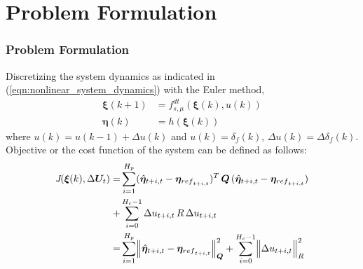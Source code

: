 \documentclass{beamer}
\DeclarePairedDelimiter{\norm}{\lVert}{\rVert}
\begin{document}

\section{Problem Formulation}
\begin{frame}
	\frametitle{Problem Formulation}
	Discretizing the system dynamics as indicated in (\ref{eqn:nonlinear_system_dynamics}) with the Euler method,
	\begin{subequations} 
		\label{eqn:discretize_system}
		\begin{align} 
		{\bm{\xi}}(k+1) &= f^{dt}_{s,\mu}(\bm{\xi}(k),u(k)) \\
		\bm{\eta}(k) &= h(\bm{\xi}(k))
		\end{align} 
	\end{subequations}
	where $u(k) = u(k-1)+\Delta u(k)$ and $u(k)=\delta_{f}(k)$, $\Delta u(k)=\Delta\delta_{f}(k)$. Objective or the cost function of the system can be defined as follows:
	\begin{align}
		{\textit{J}}(\boldsymbol{\xi}(k),\Delta\boldsymbol{U}_{t}) =& \sum\limits_{i=1}^{H_{p}}(\hat{\boldsymbol{\eta}}_{t+i,t}-{\boldsymbol{\eta}}_{{ref}_{t+i,t}})^{T}\,\boldsymbol{{Q}}\,(\hat{\boldsymbol{\eta}}_{t+i,t}-{\boldsymbol{\eta}}_{{ref}_{t+i,t}})  \nonumber\\
		+&\sum\limits_{i=0}^{H_{c}-1}\Delta{u}_{t+i,t}\,{R}\,\Delta{u}_{t+i,t}\, \\
		=& \sum\limits_{i=1}^{H_{p}} \norm[\Big]{\hat{\boldsymbol{\eta}}_{t+i,t}-{\boldsymbol{\eta}}_{{ref}_{t+i,t}}}^{2}_{\boldsymbol{Q}} + \sum\limits_{i=0}^{H_{c}-1}  \norm[\Big]{\Delta{u}_{t+i,t}}^{2}_{R} \nonumber
	\end{align} 
\end{frame}
\end{document}
